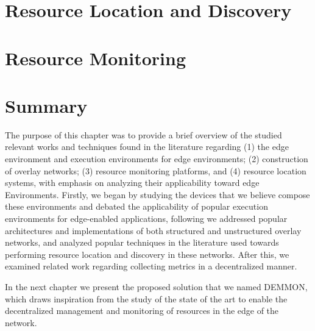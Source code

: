 \section{Resource Location and Discovery} \label{sec:res_location} 

\section{Resource Monitoring} \label{sec:res_monitoring} 


\section{Summary}

The purpose of this chapter was to provide a brief overview of the studied relevant works and techniques found in the literature regarding (1) the edge environment and execution environments for edge environments; (2) construction of overlay networks; (3) resource monitoring platforms, and (4) resource location systems, with emphasis on analyzing their applicability toward edge Environments. Firstly, we began by studying the devices that we believe compose these environments and debated the applicability of popular execution environments for edge-enabled applications, following we addressed popular architectures and implementations of both structured and unstructured overlay networks, and analyzed popular techniques in the literature used towards performing resource location and discovery in these networks. After this, we examined related work regarding collecting metrics in a decentralized manner.

In the next chapter we present the proposed solution that we named DEMMON, which draws inspiration from the study of the state of the art to enable the decentralized management and monitoring of resources in the edge of the network.